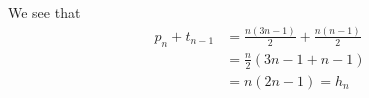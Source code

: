 \begin{questions}
    \begin{solution}
        We see that
        \begin{align*}
            p_n+t_{n-1} &= \frac{n(3n-1)}{2} +\frac{n(n-1)}{2}\\
            &= \frac{n}{2}\left(3n-1+n-1\right)\\
            &=n(2n-1) = h_n
        \end{align*}
        \qedsymbol
    \end{solution}
\end{questions}